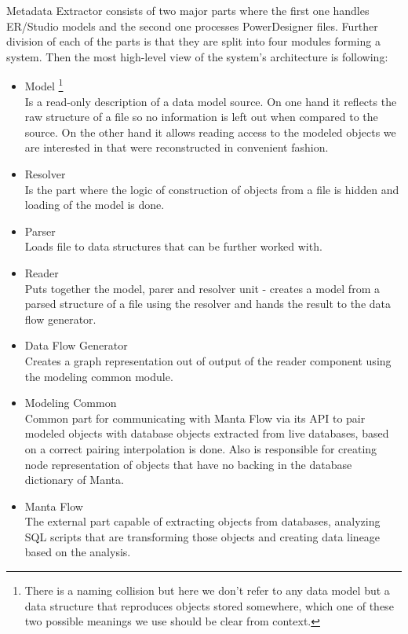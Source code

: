 Metadata Extractor consists of two major parts where the first one handles ER/Studio models and the second one processes PowerDesigner files.
Further division of each of the parts is that they are split into four modules forming a system. 
Then the most high-level view of the system's architecture is following:
\begin{itemize}
	\item Model \footnote{There is a naming collision but here we don't refer to any data model but a data structure that reproduces objects stored somewhere, which one of these two possible meanings we use should be clear from context.}\\ 
	Is a read-only description of a data model source. On one hand it reflects the raw structure of a file so no information is left out when compared to the source. 
	On the other hand it allows reading access to the modeled objects we are interested in that were reconstructed in convenient fashion.
	\item Resolver \\ 
	Is the part where the logic of construction of objects from a file is hidden and loading of the model is done. 
	\item Parser \\ 
	Loads file to data structures that can be further worked with.
	\item Reader \\
	Puts together the model, parer and resolver unit - creates a model from a parsed structure of a file using the resolver and hands the result to the data flow generator.
	\item Data Flow Generator \\ 
	Creates a graph representation out of output of the reader component using the modeling common module. 
	\item Modeling Common \\
	Common part for communicating with Manta Flow via its API to pair modeled objects with database objects extracted from live databases, based on a correct pairing interpolation is done. Also is responsible for creating node representation of objects that have no backing in the database dictionary of Manta.
	\item Manta Flow \\
	The external part capable of extracting objects from databases, analyzing SQL scripts that are transforming those objects and creating data lineage based on the analysis.
\end{itemize}

